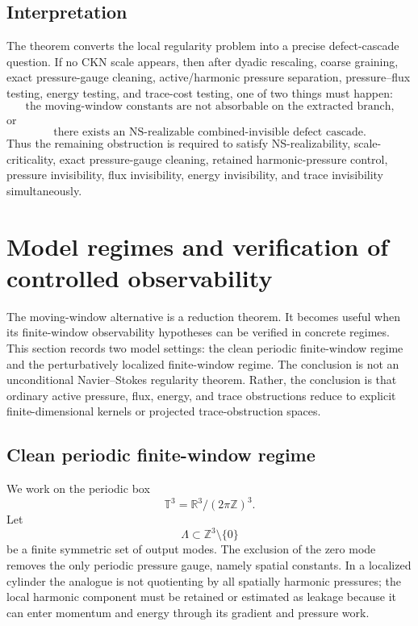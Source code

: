 \documentclass[11pt]{article}
\numberwithin{equation}{section}
\theoremstyle{plain}
\theoremstyle{definition}
\theoremstyle{remark}
\newcommand{\R}{\mathbb R}
\newcommand{\T}{\mathbb T}
\newcommand{\Z}{\mathbb Z}
\begin{document}
\subsection{Interpretation}

The theorem converts the local regularity problem into a precise defect-cascade
question.  If no CKN scale appears, then after dyadic rescaling, coarse
graining, exact pressure-gauge cleaning, active/harmonic pressure separation, pressure--flux testing, energy testing, and trace-cost
testing, one of two things must happen:
\[
        \text{the moving-window constants are not absorbable on the extracted branch,}
\]
or
\[
        \text{there exists an NS-realizable combined-invisible defect cascade.}
\]
Thus the remaining obstruction is required to satisfy NS-realizability,
scale-criticality, exact pressure-gauge cleaning, retained harmonic-pressure control, pressure invisibility, flux
invisibility, energy invisibility, and trace invisibility simultaneously.


\section{Model regimes and verification of controlled observability}
\label{sec:model-regimes}

The moving-window alternative is a reduction theorem.  It becomes useful when
its finite-window observability hypotheses can be verified in concrete regimes.
This section records two model settings: the clean periodic finite-window regime
and the perturbatively localized finite-window regime.  The conclusion is not an
unconditional Navier--Stokes regularity theorem.  Rather, the conclusion is that
ordinary active pressure, flux, energy, and trace obstructions reduce to explicit
finite-dimensional kernels or projected trace-obstruction spaces.

\subsection{Clean periodic finite-window regime}

We work on the periodic box
\[
        \T^3=\R^3/(2\pi\Z)^3.
\]
Let
\[
        \Lambda\subset \Z^3\setminus\{0\}
\]
be a finite symmetric set of output modes.  The exclusion of the zero mode removes the only periodic pressure gauge, namely spatial constants.  In a localized cylinder the analogue is not quotienting by all spatially harmonic pressures; the local harmonic component must be retained or estimated as leakage because it can enter momentum and energy through its gradient and pressure work.
\end{document}
